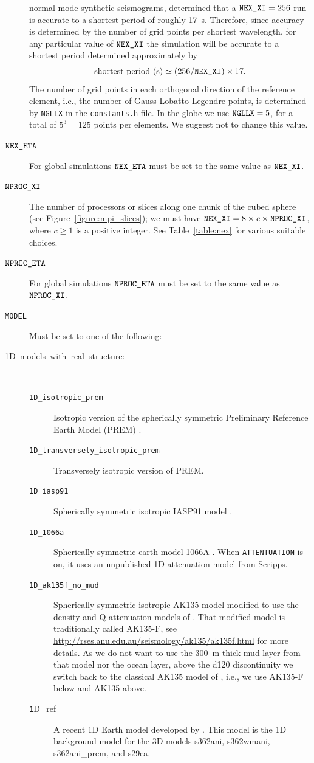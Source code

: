 \documentclass[oneside,english]{book}
\newcommand{\nexxi}{\mbox{\texttt{NEX\_XI}}}
\newcommand{\nexeta}{\mbox{\texttt{NEX\_ETA}}}
\newcommand{\nprocxi}{\mbox{\texttt{NPROC\_XI}}}
\newcommand{\nproceta}{\mbox{\texttt{NPROC\_ETA}}}
\begin{document}
\begin{description}
normal-mode synthetic seismograms, \citet{KoTr02a,KoTr02b} determined
that a $\nexxi=256$ run is accurate to a shortest period of roughly
17~s. Therefore, since accuracy is determined by the number of grid
points per shortest wavelength, for any particular value of $\nexxi$
the simulation will be accurate to a shortest period determined approximately
by \begin{equation}
\mbox{shortest period (s)}\simeq(256/\nexxi)\times17.\label{eq:shortest_period}\end{equation}
 The number of grid points in each orthogonal direction of the reference
element, i.e., the number of Gauss-Lobatto-Legendre points, is determined
by \texttt{NGLLX} in the \texttt{constants.h} file. In the globe we
use $\mbox{\texttt{NGLLX}}=5$, for a total of $5^{3}=125$ points
per elements. We suggest not to change this value.
\item [{$\nexeta$}] For global simulations $\nexeta$ must be set to the
same value as $\nexxi$.
\item [{$\nprocxi$}] The number of processors or slices along one chunk
of the cubed sphere (see Figure~\ref{figure:mpi_slices}); we must
have $\nexxi=8\times c\times\nprocxi$, where $c\ge1$ is a positive
integer. See Table~\ref{table:nex} for various suitable choices.
\item [{$\nproceta$}] For global simulations $\nproceta$ must be set
to the same value as $\nprocxi$.
\item [{\texttt{MODEL}}] Must be set to one of the following:
\item [{\textmd{1D~models~with~real~structure:}}]~

\begin{description}
\item [{\texttt{1D\_isotropic\_prem}}] Isotropic version of the spherically
symmetric Preliminary Reference Earth Model (PREM) \citep{DzAn81}.
\item [{\texttt{1D\_transversely\_isotropic\_prem}}] Transversely isotropic
version of PREM.
\item [{\texttt{1D\_iasp91}}] Spherically symmetric isotropic IASP91 model
\citep{KeEn91}.
\item [{\texttt{1D\_1066a}}] Spherically symmetric earth model 1066A \citep{gilbertdziewonski1975}.
When \texttt{\small ATTENTUATION} is on, it uses an unpublished 1D
attenuation model from Scripps.
\item [{\texttt{1D\_ak135f\_no\_mud}}] Spherically symmetric isotropic AK135 model
\citep{KeEnBu95} modified to use the density and Q attenuation models of \cite{MoKe95}.
That modified model is traditionally called AK135-F,
see \url{http://rses.anu.edu.au/seismology/ak135/ak135f.html} for more details.
As we do not want to use the 300~m-thick mud layer from that model nor the ocean layer,
above the d120 discontinuity we switch back to the classical AK135 model of \cite{KeEnBu95},
i.e., we use AK135-F below and AK135 above.
\item [{\texttt{1}D\_ref}] A recent 1D Earth model developed by \citet{KuDzEk06}.
This model is the 1D background model for the 3D models s362ani, s362wmani,
s362ani\_prem, and s29ea.
\end{description}
\end{description}
\end{document}
